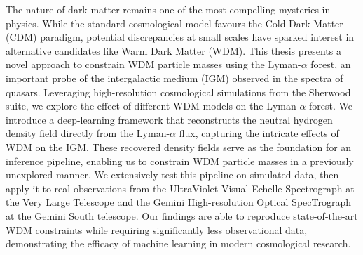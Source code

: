 \documentclass[
     12pt,                    %
     a4paper,             %
     BCOR=10mm,     %
     DIV=14,                 %
     listof=totoc,                    %
     bibliography=totoc,       %
     index=totoc,              %
     twoside,
     headsepline
     ]{scrreprt}
\begin{document}
The nature of dark matter remains one of the most compelling mysteries in physics. While the standard cosmological model favours the Cold Dark Matter (CDM) paradigm, potential discrepancies at small scales have sparked interest in alternative candidates like Warm Dark Matter (WDM). This thesis presents a novel approach to constrain WDM particle masses using the Lyman-$\alpha$ forest, an important probe of the intergalactic medium (IGM) observed in the spectra of quasars. Leveraging high-resolution cosmological simulations from the Sherwood suite, we explore the effect of different WDM models on the Lyman-$\alpha$ forest. We introduce a deep-learning framework that reconstructs the neutral hydrogen density field directly from the Lyman-$\alpha$  flux, capturing the intricate effects of WDM on the IGM. These recovered density fields serve as the foundation for an inference pipeline, enabling us to constrain WDM particle masses in a previously unexplored manner. We extensively test this pipeline on simulated data, then apply it to real observations from the UltraViolet-Visual Echelle Spectrograph at the Very Large Telescope and the Gemini High-resolution Optical SpecTrograph at the Gemini South telescope. Our findings are able to reproduce state-of-the-art WDM constraints while requiring significantly less observational data, demonstrating the efficacy of machine learning in modern cosmological research.
\cleardoublepage

\tableofcontents
\cleardoublepage
{} 


\cleardoublepage












\printbibliography
\end{document}
